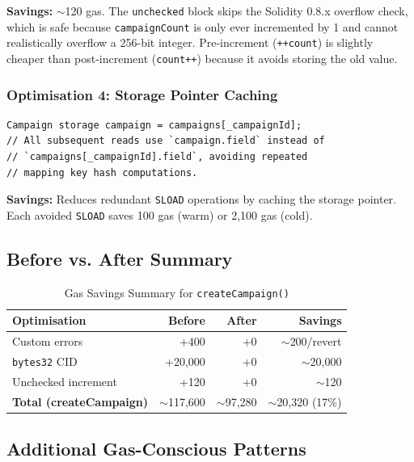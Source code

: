 \textbf{Savings:} $\sim$120 gas. The \texttt{unchecked} block skips the Solidity 0.8.x overflow check, which is safe because \texttt{campaignCount} is only ever incremented by 1 and cannot realistically overflow a 256-bit integer. Pre-increment (\texttt{++count}) is slightly cheaper than post-increment (\texttt{count++}) because it avoids storing the old value.

\subsubsection{Optimisation 4: Storage Pointer Caching}

\begin{lstlisting}[language=Solidity]
Campaign storage campaign = campaigns[_campaignId];
// All subsequent reads use `campaign.field` instead of
// `campaigns[_campaignId].field`, avoiding repeated
// mapping key hash computations.
\end{lstlisting}

\textbf{Savings:} Reduces redundant \texttt{SLOAD} operations by caching the storage pointer. Each avoided \texttt{SLOAD} saves 100 gas (warm) or 2,100 gas (cold).

\subsection{Before vs. After Summary}

\begin{table}[H]
\centering
\caption{Gas Savings Summary for \texttt{createCampaign()}}
\label{tab:gassummary}
\begin{tabular}{l r r r}
\toprule
\textbf{Optimisation} & \textbf{Before} & \textbf{After} & \textbf{Savings} \\
\midrule
Custom errors              & +400   & +0     & $\sim$200/revert \\
\texttt{bytes32} CID       & +20,000 & +0    & $\sim$20,000 \\
Unchecked increment        & +120   & +0     & $\sim$120 \\
\midrule
\textbf{Total (createCampaign)} & $\sim$117,600 & $\sim$97,280 & $\sim$20,320 (17\%) \\
\bottomrule
\end{tabular}
\end{table}

\subsection{Additional Gas-Conscious Patterns}

